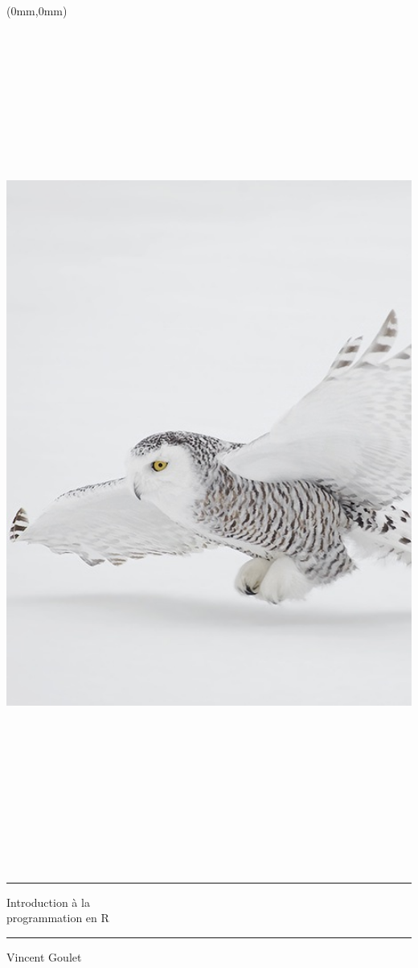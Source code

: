 \documentclass[letterpaper,11pt]{memoir}
\begin{document}
\begin{textblock*}{216mm}(0mm,0mm)
  \includegraphics[height=279mm,keepaspectratio=true]{harfang.jpg} \\
\end{textblock*}

\begin{adjustwidth*}{-12mm}{-30mm}
  \sffamily
  \raggedright
  \vspace*{-17mm}
  \rule{\linewidth}{2pt}
  \fontsize{42}{42}\selectfont
  Introduction
  à la \\
  programmation
  en
  R \\[-10pt]
  \rule{\linewidth}{2pt}
  \vspace*{32mm}
  \fontsize{24}{36}\selectfont
  Vincent Goulet
\end{adjustwidth*}
\end{document}
